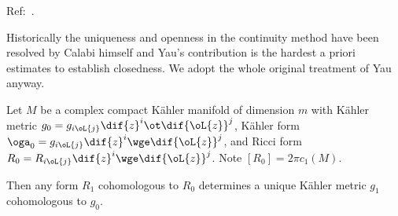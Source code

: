 \documentclass[a4paper, twoside]{article}
\begin{document}
\confighead{}{}{}


Ref:~\cite{Yau1978}.

Historically the uniqueness and openness in the continuity method have been resolved by Calabi himself and Yau's contribution is the hardest a priori estimates to establish closedness. We adopt the whole original treatment of Yau anyway.

\begin{thm}
	Let $M$ be a complex compact K{\"a}hler manifold of dimension $m$ with K{\"a}hler metric $g_{0}=g_{i\oL{j}}\dif{z}^{i}\ot\dif{\oL{z}}^{j}$, K{\"a}hler form $\oga_{0}=g_{i\oL{j}}\dif{z}^{i}\wge\dif{\oL{z}}^{j}$, and Ricci form $R_{0}=R_{i\oL{j}}\dif{z}^{i}\wge\dif{\oL{z}}^{j}$. Note $[R_{0}]=2\pi c_{1}(M)$.

	Then any form $R_{1}$ cohomologous to $R_{0}$ determines a unique K{\"a}hler metric $g_{1}$ cohomologous to $g_{0}$.
\end{thm}
\end{document}
